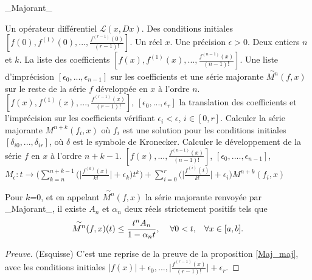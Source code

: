 \documentclass[a4paper,10pt]{article}
\begin{document}
	\begin{algorithm}
		\caption{\_Majorant\_}
		\begin{algorithmic}[1]
			\REQUIRE Un opérateur différentiel $\mathcal{L}(x,Dx)$. Des conditions initiales $[f(0),f^{(1)}(0),...,\frac{f^{(r-1)}(0)}{(r-1)!}]$. Un réel $x$. Une précision $\epsilon>0$. Deux entiers $n$ et $k$. 
			\ENSURE  La liste des coefficients $[f(x),f^{(1)}(x),...,\frac{f^{(n-1)}(x)}{(n-1)!}]$. Une liste d'imprécision $[\epsilon_0,...,\epsilon_{n-1}]$ sur les coefficients et une série majorante $\overset{\sim}{M^n}(f,x)$ sur le reste de la série $f$ développée en $x$ à l'ordre $n$.
			\STATE $[f(x),f^{(1)}(x),...,\frac{f^{(r-1)}(x)}{(r-1)!}]$, $[\epsilon_0,...,\epsilon_{r}]$ la translation des coefficients et l'imprécision sur les coefficients vérifiant $\epsilon_i<\epsilon$, $i \in [0,r]$.
			\STATE Calculer la série majorante $M^{n+k}(f_i,x)$ où $f_i$ est une solution pour les conditions initiales $[\delta_{i0},...,\delta_{ir}]$, où $\delta$ est le symbole de Kronecker.
			\ENDFOR 
			\STATE Calculer le développement de la série $f$ en $x$ à l'ordre $n+k-1$.
			\RETURN$[f(x),...,\frac{f^{(n-1)}(x)}{(n-1)!}]$, $[\epsilon_0,....,\epsilon_{n-1}]$, $M_{\epsilon}:t \rightarrow \Big(\sum_{k=n}^{n+k-1}\Big(\Big|\frac{f^{(k)}(x)}{k!}\Big|+\epsilon_k\Big)t^k\Big)+\sum_{i=0}^{r}\Big(\Big|\frac{f^{(i)}(i)}{k!}\Big|+\epsilon_i\Big) M^{n+k}(f_i,x)$
		\end{algorithmic}
	\label{Majorant}
	\end{algorithm}
	\begin{proposition}
		Pour $k$=0, et en appelant $\overset{\sim}{M^n}(f,x)$ la série majorante renvoyée par \_Majorant\_, il existe $A_n$ et $\alpha_n$ deux réels strictement positifs tels que
		\[\overset{\sim}{M^n}(f,x)(t)\leq \frac{t^n A_n}{1-\alpha_n t}, \hspace{4mm} \forall 0<t, \hspace{3mm} \forall x\in [a,b].\]
		\label{Maj_maj1}
	\end{proposition}
	\begin{proof}[Preuve](Esquisse)
		C'est une reprise de la preuve de la proposition \ref{Maj_maj}, avec les conditions initiales $|f(x)|+\epsilon_0,...,\Big|\frac{f^{(r-1)}(x)}{(r-1)!}\Big|+\epsilon_r$.
	\end{proof}
		
	
\end{document}
